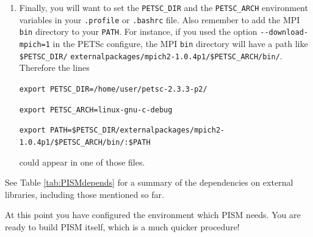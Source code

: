 \documentclass[11pt,final]{amsart}
\begin{document}
\begin{enumerate}
\begin{enumerate}
\item Finally, you will want to set the \verb|PETSC_DIR| and the \verb|PETSC_ARCH| environment variables in your \verb|.profile| or \verb|.bashrc| file.  Also remember to add the MPI \verb|bin| directory to your \verb|PATH|.  For instance, if you used the option \verb|--download-mpich=1| in the PETSc configure, the MPI \verb|bin| directory will have a path like \verb|$PETSC_DIR/| \verb|externalpackages/mpich2-1.0.4p1/$PETSC_ARCH/bin/|.  Therefore the lines 

\small
\verb|export PETSC_DIR=/home/user/petsc-2.3.3-p2/|

\verb|export PETSC_ARCH=linux-gnu-c-debug|

\verb|export PATH=$PETSC_DIR/externalpackages/mpich2-1.0.4p1/$PETSC_ARCH/bin/:$PATH|
\normalsize

\noindent could appear in one of those files.
\end{enumerate}
\end{enumerate}

\bigskip
See Table \ref{tab:PISMdepends} for a summary of the dependencies on external libraries, including those mentioned so far.

\medskip
At this point you have configured the environment which PISM needs.  You are ready to build PISM itself, which is a much quicker procedure!
\bigskip
\end{document}
